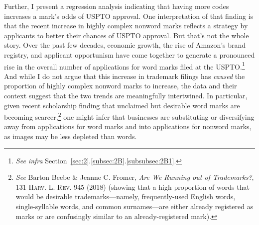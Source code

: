 \documentclass[letterpaper, 11pt, oneside]{article}
\begin{document}
Further, I present a regression analysis indicating that having more codes increases a mark's odds of USPTO approval. One interpretation of that finding is that the recent increase in highly complex nonword marks reflects a strategy by applicants to better their chances of USPTO approval. But that's not the whole story. Over the past few decades, economic growth, the rise of Amazon's brand registry, and applicant opportunism have come together to generate a pronounced rise in the overall number of applications for word marks filed at the USPTO.\footnote{\textit{See infra} Section~\ref{sec:2}.\ref{subsec:2B}.\ref{subsubsec:2B1}.} And while I do not argue that this increase in trademark filings has \emph{caused} the proportion of highly complex nonword marks to increase, the data and their context suggest that the two trends are meaningfully intertwined. In particular, given recent scholarship finding that unclaimed but desirable word marks are becoming scarcer,\footnote{\label{supra4} \textit{See} Barton Beebe \& Jeanne C. Fromer, \textit{Are We Running out of Trademarks?}, 131 \textsc{Harv. L. Rev.} 945 (2018) (showing that a high proportion of words that would be desirable trademarks—namely, frequently-used English words, single-syllable words, and common surnames—are either already registered as marks or are confusingly similar to an already-registered mark).} one might infer that businesses are substituting or diversifying away from applications for word marks and into applications for nonword marks, as images may be less depleted than words.
\end{document}
